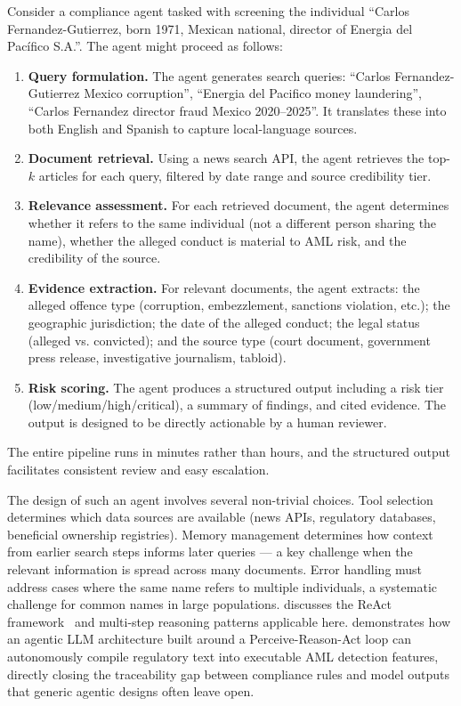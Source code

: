 \begin{example}
\label{ex:agentic-adverse-media}
Consider a compliance agent tasked with screening the individual ``Carlos Fernandez-Gutierrez, born 1971, Mexican national, director of Energia del Pacífico S.A.''. The agent might proceed as follows:

\begin{enumerate}
  \item \textbf{Query formulation.} The agent generates search queries: ``Carlos Fernandez-Gutierrez Mexico corruption'', ``Energia del Pacifico money laundering'', ``Carlos Fernandez director fraud Mexico 2020--2025''. It translates these into both English and Spanish to capture local-language sources.
  \item \textbf{Document retrieval.} Using a news search API, the agent retrieves the top-$k$ articles for each query, filtered by date range and source credibility tier.
  \item \textbf{Relevance assessment.} For each retrieved document, the agent determines whether it refers to the same individual (not a different person sharing the name), whether the alleged conduct is material to AML risk, and the credibility of the source.
  \item \textbf{Evidence extraction.} For relevant documents, the agent extracts: the alleged offence type (corruption, embezzlement, sanctions violation, etc.); the geographic jurisdiction; the date of the alleged conduct; the legal status (alleged vs. convicted); and the source type (court document, government press release, investigative journalism, tabloid).
  \item \textbf{Risk scoring.} The agent produces a structured output including a risk tier (low/medium/high/critical), a summary of findings, and cited evidence. The output is designed to be directly actionable by a human reviewer.
\end{enumerate}
The entire pipeline runs in minutes rather than hours, and the structured output facilitates consistent review and easy escalation.
\end{example}

The design of such an agent involves several non-trivial choices. Tool selection determines which data sources are available (news APIs, regulatory databases, beneficial ownership registries). Memory management determines how context from earlier search steps informs later queries --- a key challenge when the relevant information is spread across many documents. Error handling must address cases where the same name refers to multiple individuals, a systematic challenge for common names in large populations.  discusses the ReAct framework~\cite{yao2022react} and multi-step reasoning patterns applicable here. \citet{Ngam2026} demonstrates how an agentic LLM architecture built around a Perceive-Reason-Act loop can autonomously compile regulatory text into executable AML detection features, directly closing the traceability gap between compliance rules and model outputs that generic agentic designs often leave open.

